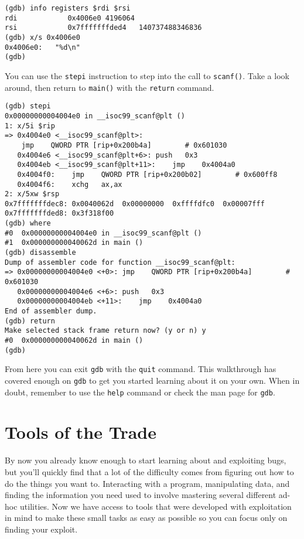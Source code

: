 \documentclass{article}
\begin{document}
\begin{lstlisting}
(gdb) info registers $rdi $rsi
rdi            0x4006e0	4196064
rsi            0x7fffffffded4	140737488346836
(gdb) x/s 0x4006e0
0x4006e0:	"%d\n"
(gdb) 
\end{lstlisting}

You can use the \texttt{stepi} instruction to step into the call to
\texttt{scanf()}. Take a look around, then return to \texttt{main()} with the
\texttt{return} command.

\begin{lstlisting}
(gdb) stepi 
0x00000000004004e0 in __isoc99_scanf@plt ()
1: x/5i $rip
=> 0x4004e0 <__isoc99_scanf@plt>:	
    jmp    QWORD PTR [rip+0x200b4a]        # 0x601030
   0x4004e6 <__isoc99_scanf@plt+6>:	push   0x3
   0x4004eb <__isoc99_scanf@plt+11>:	jmp    0x4004a0
   0x4004f0:	jmp    QWORD PTR [rip+0x200b02]        # 0x600ff8
   0x4004f6:	xchg   ax,ax
2: x/5xw $rsp
0x7fffffffdec8:	0x0040062d	0x00000000	0xffffdfc0	0x00007fff
0x7fffffffded8:	0x3f318f00
(gdb) where
#0  0x00000000004004e0 in __isoc99_scanf@plt ()
#1  0x000000000040062d in main ()
(gdb) disassemble 
Dump of assembler code for function __isoc99_scanf@plt:
=> 0x00000000004004e0 <+0>:	jmp    QWORD PTR [rip+0x200b4a]        # 0x601030
   0x00000000004004e6 <+6>:	push   0x3
   0x00000000004004eb <+11>:	jmp    0x4004a0
End of assembler dump.
(gdb) return
Make selected stack frame return now? (y or n) y
#0  0x000000000040062d in main ()
(gdb) 
\end{lstlisting}

From here you can exit \texttt{gdb} with the \texttt{quit} command. This
walkthrough has covered enough on \texttt{gdb} to get you started learning about
it on your own. When in doubt, remember to use the \texttt{help} command or
check the man page for \texttt{gdb}.

\section{Tools of the Trade}
By now you already know enough to start learning about and exploiting bugs, but
you'll quickly find that a lot of the difficulty comes from figuring out how to
do the things you want to. Interacting with a program, manipulating data, and
finding the information you need used to involve mastering several different
ad-hoc utilities. Now we have access to tools that were developed with
exploitation in mind to make these small tasks as easy as possible so you can
focus only on finding your exploit.
\end{document}

